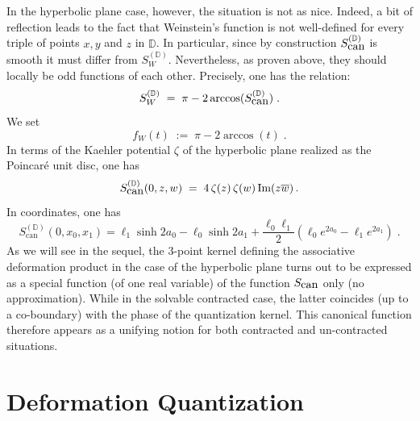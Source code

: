 \documentclass{article}
\newcommand{\DD}{\mathbb D}
\begin{document}
\noindent In the hyperbolic plane case, however, the situation is not as nice. Indeed, a bit of reflection leads to the fact that Weinstein's
function is not well-defined for every triple of points $x,y$ and $z$ in $\DD$. In particular, since by construction $S^{(\DD)}_{\mbox{\rm can}}$ is smooth it must differ from $S^{(\DD)}_W$. Nevertheless, as proven above,
they should locally be odd functions of each other. Precisely, one has the relation:
\begin{equation*}
S^{(\DD)}_W\;=\;\pi-2\arccos(S^{(\DD)}_{\mbox{\rm can}})\;.
\end{equation*}
We set 
\begin{equation}\label{fW}
f_W(t)\;:=\; \pi-2\arccos(t)\;.
\end{equation}
In terms of the Kaehler potential $\zeta$ of the hyperbolic plane realized as the Poincar\'e unit disc, one has 
\begin{equation*}
S^{(\DD)}_{\mbox{can}}(0,z,w)\;=\;4\,\zeta(z)\,\zeta(w)\,\mbox{\rm Im}(z\overline{w})\,.
\end{equation*}
In coordinates, one has
\begin{equation}
S^{(\DD)}_{\mbox{can}}(0,x_0,x_1)=\ell_1 \sinh 2 a_0 -\ell_0\sinh 2 a_1 + \frac{\ell_0
\ell_1}{2}(\ell_0 e^{2 a_0} -\ell_1e^{2 a_1})\;.
\end{equation}
\noindent As we will see in the sequel, the 3-point kernel defining the associative  deformation product in the case of the hyperbolic plane turns out to be expressed as a special function (of one real variable) of the function $S_{\mbox{\rm can}}$ only (no approximation). While in the solvable contracted case, the latter coincides (up to a co-boundary) with the phase of the quantization kernel. This canonical function therefore appears as a unifying notion for  both contracted and un-contracted situations.

\section{Deformation Quantization}\label{QuaPoin}
\end{document}
